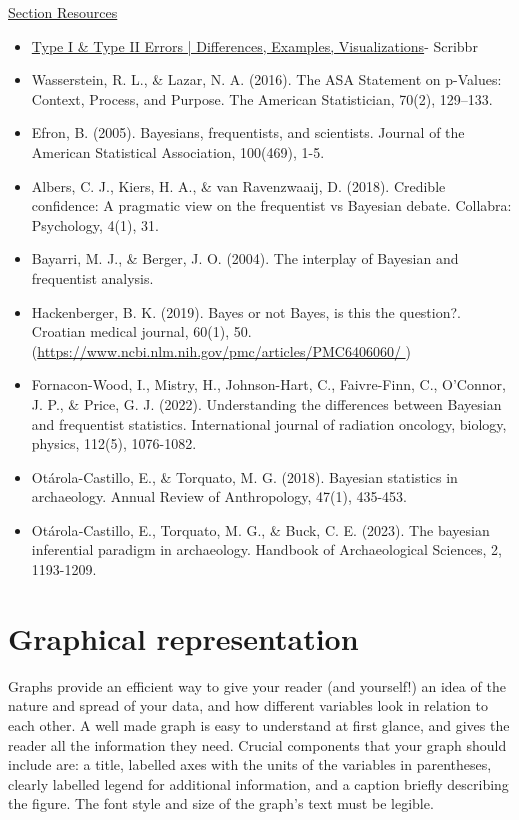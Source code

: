 \documentclass{article}
\begin{document}
\underline{Section Resources}
\begin{itemize}
    \item \href{https://www.scribbr.com/statistics/type-i-and-type-ii-errors/}{Type I \& Type II Errors | Differences, Examples, Visualizations}- Scribbr
    \item \hypertarget{wasserstein}{Wasserstein, R. L., \& Lazar, N. A. (2016). The ASA Statement on p-Values: Context, Process, and Purpose. The American Statistician, 70(2), 129–133.}
    \item Efron, B. (2005). Bayesians, frequentists, and scientists. Journal of the American Statistical Association, 100(469), 1-5.
    \item Albers, C. J., Kiers, H. A., \& van Ravenzwaaij, D. (2018). Credible confidence: A pragmatic view on the frequentist vs Bayesian debate. Collabra: Psychology, 4(1), 31.
    \item Bayarri, M. J., \& Berger, J. O. (2004). The interplay of Bayesian and frequentist analysis.
    \item Hackenberger, B. K. (2019). Bayes or not Bayes, is this the question?. Croatian medical journal, 60(1), 50. (\href{https://www.ncbi.nlm.nih.gov/pmc/articles/PMC6406060/ }{https://www.ncbi.nlm.nih.gov/pmc/articles/PMC6406060/ })
    \item Fornacon-Wood, I., Mistry, H., Johnson-Hart, C., Faivre-Finn, C., O'Connor, J. P., \& Price, G. J. (2022). Understanding the differences between Bayesian and frequentist statistics. International journal of radiation oncology, biology, physics, 112(5), 1076-1082.
    \item Otárola-Castillo, E., \& Torquato, M. G. (2018). Bayesian statistics in archaeology. Annual Review of Anthropology, 47(1), 435-453.
    \item Otárola‐Castillo, E., Torquato, M. G., \& Buck, C. E. (2023). The bayesian inferential paradigm in archaeology. Handbook of Archaeological Sciences, 2, 1193-1209.
\end{itemize}

\section{Graphical representation}

Graphs provide an efficient way to give your reader (and yourself!) an idea of the nature and spread of your data, and how different variables look in relation to each other. A well made graph is easy to understand at first glance, and gives the reader all the information they need. Crucial components that your graph should include are: a title, labelled axes with the units of the variables in parentheses, clearly labelled legend for additional information, and a caption briefly describing the figure. The font style and size of the graph’s text must be legible.
\end{document}
